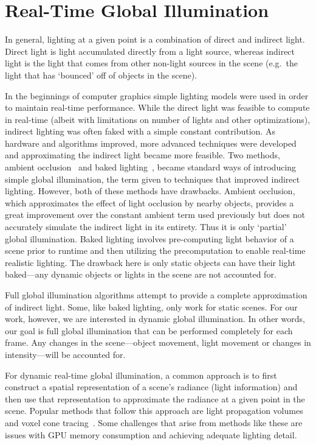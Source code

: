 \section{Real-Time Global Illumination}
In general, lighting at a given point is a combination of direct and indirect light. Direct light is light accumulated directly from a light source, whereas indirect light is the light that comes from other non-light sources in the scene (e.g.\ the light that has `bounced' off of objects in the scene).

In the beginnings of computer graphics simple lighting models were used in order to maintain real-time performance. While the direct light was feasible to compute in real-time (albeit with limitations on number of lights and other optimizations), indirect lighting was often faked with a simple constant contribution. As hardware and algorithms improved, more advanced techniques were developed and approximating the indirect light became more feasible. Two methods, ambient occlusion~\cite{bunnell2005dynamic,moller2008rtr} and baked lighting~\cite{Sloan:2002:PRT:566654.566612,moller2008rtr}, became standard ways of introducing simple global illumination, the term given to techniques that improved indirect lighting. However, both of these methods have drawbacks. Ambient occlusion, which approximates the effect of light occlusion by nearby objects, provides a great improvement over the constant ambient term used previously but does not accurately simulate the indirect light in its entirety. Thus it is only `partial' global illumination. Baked lighting involves pre-computing light behavior of a scene prior to runtime and then utilizing the precomputation to enable real-time realistic lighting. The drawback here is only static objects can have their light baked---any dynamic objects or lights in the scene are not accounted for.

Full global illumination algorithms attempt to provide a complete approximation of indirect light. Some, like baked lighting, only work for static scenes. For our work, however, we are interested in dynamic global illumination. In other words, our goal is full global illumination that can be performed completely for each frame. Any changes in the scene---object movement, light movement or changes in intensity---will be accounted for.

For dynamic real-time global illumination, a common approach is to first construct a spatial representation of a scene's radiance (light information) and then use that representation to approximate the radiance at a given point in the scene. Popular methods that follow this approach are light propagation volumes~\cite{Kaplanyan:2010:CLP:1730804.1730821} and voxel cone tracing~\cite{crassin2011interactive}. Some challenges that arise from methods like these are issues with GPU memory consumption and achieving adequate lighting detail. %


